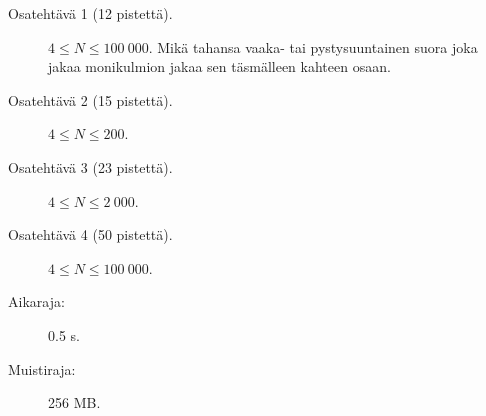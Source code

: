 \documentclass{boi2014-fi}
\begin{document}
    \Scoring

    \begin{description}
        \item[Osatehtävä 1 (12 pistettä).] $4 \le N \le 100\ 000$.
        Mikä tahansa vaaka- tai pystysuuntainen suora joka jakaa monikulmion jakaa
        sen täsmälleen kahteen osaan.
        \item[Osatehtävä 2 (15 pistettä).] $4 \le N \le 200$.
        \item[Osatehtävä 3 (23 pistettä).] $4 \le N \le 2\ 000$.
        \item[Osatehtävä 4 (50 pistettä).] $4 \le N \le 100\ 000$.
    \end{description}

    \Constraints

    \begin{description}
        \item[Aikaraja:] 0.5 s.
        \item[Muistiraja:] 256 MB.
    \end{description}
\end{document}

